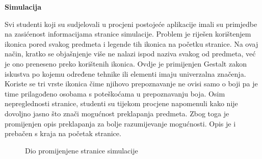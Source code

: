 \documentclass[times, utf8, zavrsni, numeric]{fer}
\begin{document}
        \vspace{\baselineskip}
        \bigbreak
        \noindent\textbf{Simulacija}
        
        Svi studenti koji su sudjelovali u procjeni postojeće aplikacije imali su primjedbe na zasićenost informacijama stranice simulacije. Problem je riješen korištenjem ikonica pored svakog predmeta i legende tih ikonica na početku stranice. Na ovaj način, kratko se objašnjenje više ne nalazi ispod naziva svakog od predmeta, već je ono preneseno preko korištenih ikonica. Ovdje je primijenjen Gestalt zakon iskustva po kojemu određene tehnike ili elementi imaju univerzalna značenja. Koriste se tri vrste ikonica čime njihovo prepoznavanje ne ovisi samo o boji pa je time prilagođeno osobama s poteškoćama u prepoznavanju boja. Osim nepreglednosti stranice, studenti su tijekom procjene napomenuli kako nije dovoljno jasno što znači mogućnost preklapanja predmeta. Zbog toga je promijenjen opis preklapanja za bolje razumijevanje mogućnosti. Opis je i prebačen s kraja na početak stranice.

        \begin{figure} [H]
          \centering
          \caption{Dio promijenjene stranice simulacije}
        \end{figure}
\end{document}
